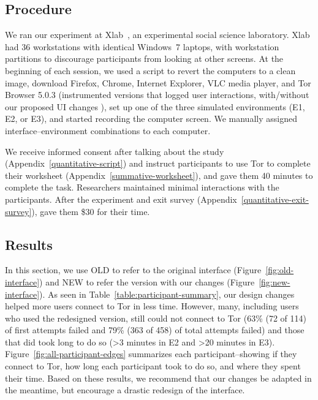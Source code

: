 \documentclass[USenglish,oneside,twocolumn]{article}
\begin{document}
\subsection{Procedure}
We ran our experiment at Xlab~\cite{xlab}, an experimental social science laboratory. Xlab had 36 workstations with identical Windows~7 laptops, with workstation partitions to discourage participants from looking at other screens. At the beginning of each session, we used a script to revert the computers to a clean image, download Firefox, Chrome, Internet Explorer, VLC media player, and Tor Browser 5.0.3 (instrumented versions that logged user interactions, with/without our proposed UI changes ), set up one of the three simulated environments (E1, E2, or E3), and started recording the computer screen. We manually assigned interface--environment combinations to each computer.

We receive informed consent after talking about the study (Appendix~\ref{quantitative-script}) and instruct participants to use Tor to complete their worksheet (Appendix~\ref{summative-worksheet}), and gave them 40 minutes to complete the task. Researchers maintained minimal interactions with the participants. After the experiment and exit survey (Appendix~\ref{quantitative-exit-survey}), gave them \$30 for their time. 

\subsection{Results} 
In this section, we use OLD to refer to the original interface (Figure~\ref{fig:old-interface}) and NEW to refer the version with our changes (Figure~\ref{fig:new-interface}). As seen in Table~\ref{table:participant-summary}, our design changes helped more users connect to Tor in less time. However, many, including users who used the redesigned version, still could not connect to Tor (63\% (72 of 114) of first attempts failed and 79\% (363 of 458) of total attempts failed) and those that did took long to do so (>3 minutes in E2 and >20 minutes in E3). Figure~\ref{fig:all-participant-edges} summarizes each participant--showing if they connect to Tor, how long each participant took to do so, and where they spent their time. Based on these results, we recommend that our changes be adapted in the meantime, but encourage a drastic redesign of the interface.
\end{document}
